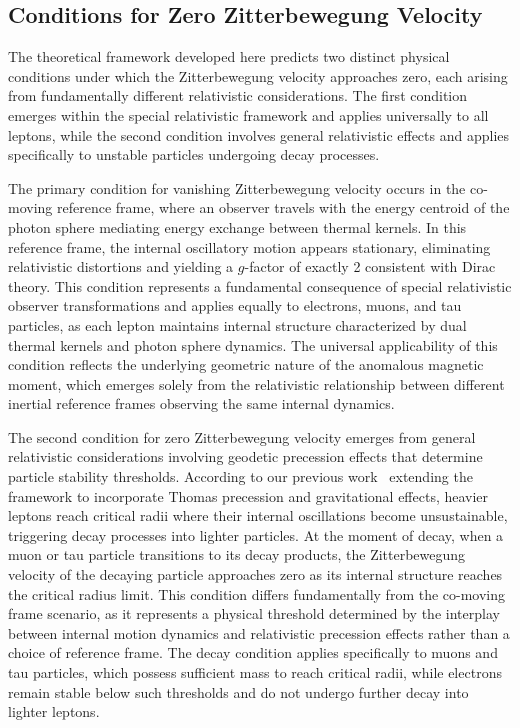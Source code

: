 \documentclass[%
 reprint,
 amsmath,amssymb,
 aps,
]{revtex4-1}
\numberwithin{equation}{section}%
\begin{document}
\subsection{Conditions for Zero Zitterbewegung Velocity}

The theoretical framework developed here predicts two distinct physical conditions under which the Zitterbewegung velocity approaches zero, each arising from fundamentally different relativistic considerations. The first condition emerges within the special relativistic framework and applies universally to all leptons, while the second condition involves general relativistic effects and applies specifically to unstable particles undergoing decay processes.

The primary condition for vanishing Zitterbewegung velocity occurs in the co-moving reference frame, where an observer travels with the energy centroid of the photon sphere mediating energy exchange between thermal kernels. In this reference frame, the internal oscillatory motion appears stationary, eliminating relativistic distortions and yielding a $g$-factor of exactly 2 consistent with Dirac theory. This condition represents a fundamental consequence of special relativistic observer transformations and applies equally to electrons, muons, and tau particles, as each lepton maintains internal structure characterized by dual thermal kernels and photon sphere dynamics. The universal applicability of this condition reflects the underlying geometric nature of the anomalous magnetic moment, which emerges solely from the relativistic relationship between different inertial reference frames observing the same internal dynamics.

The second condition for zero Zitterbewegung velocity emerges from general relativistic considerations involving geodetic precession effects that determine particle stability thresholds. According to our previous work~\cite{hanamura2501.0130} extending the framework to incorporate Thomas precession and gravitational effects, heavier leptons reach critical radii where their internal oscillations become unsustainable, triggering decay processes into lighter particles. At the moment of decay, when a muon or tau particle transitions to its decay products, the Zitterbewegung velocity of the decaying particle approaches zero as its internal structure reaches the critical radius limit. This condition differs fundamentally from the co-moving frame scenario, as it represents a physical threshold determined by the interplay between internal motion dynamics and relativistic precession effects rather than a choice of reference frame. The decay condition applies specifically to muons and tau particles, which possess sufficient mass to reach critical radii, while electrons remain stable below such thresholds and do not undergo further decay into lighter leptons.
\end{document}
